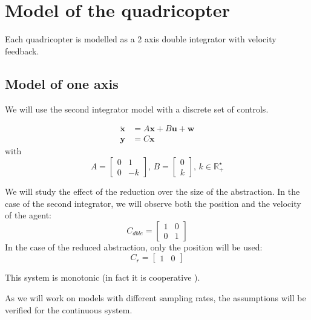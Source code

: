 \section{Model of the quadricopter}
Each quadricopter is modelled as a 2 axis double integrator with velocity feedback.

\subsection{Model of one axis}
We will use the second integrator model with a discrete set of controls.

\begin{equation}\label{eqn:lin_sys}
\begin{split}
\dot{\mathbf{x}} &= A \mathbf{x} + B \mathbf{u} + \mathbf{w}\\
\mathbf{y} &= C\mathbf{x}
\end{split}
\end{equation}
with
\begin{equation*} \label{eqn:sec_int}
A = \begin{bmatrix}
0 & 1\\ 
0 & -k
\end{bmatrix}
\textrm{, }
B = \begin{bmatrix}
0 \\ 
k 
\end{bmatrix}
\textrm{, }
k \in \mathbb{R}_+^\star
\end{equation*}

We will study the effect of the reduction over the size of the abstraction. In the case of the second integrator, we will observe both the position and the velocity of the agent:
\begin{equation}
C_{dble} = \begin{bmatrix}
1 & 0\\
0 & 1
\end{bmatrix}
\end{equation}
In the case of the reduced abstraction, only the position will be used:
\begin{equation}
 C_r = \begin{bmatrix}
 1 & 0
 \end{bmatrix}
\end{equation}

This system is monotonic (in fact it is cooperative ).

As we will work on models with different sampling rates, the assumptions will be verified for the continuous system.

